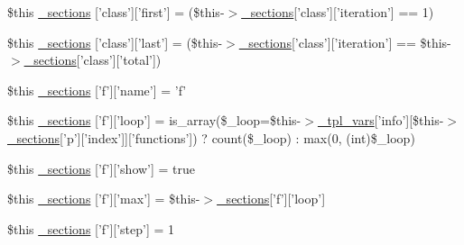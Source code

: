 \begin{DoxyCompactItemize}
\item 
\$this \hyperlink{_06_06-72_05_06_06-727729411_05left__frame_8tpl_8php_af9ec324c252510a476297b78b7391d23}{\-\_\-sections} \mbox{[}'class'\mbox{]}\mbox{[}'first'\mbox{]} = (\$this-\/$>$\hyperlink{_06_06127_05_06_0612781687_05pkgelementindex_8tpl_8php_a9e3d26b39edfe29c3f29b8035ef33828}{\-\_\-sections}\mbox{[}'class'\mbox{]}\mbox{[}'iteration'\mbox{]} == 1)
\item 
\$this \hyperlink{_06_06-72_05_06_06-727729411_05left__frame_8tpl_8php_ac4c55d054b0d9c9a6f09a4e31871f7d7}{\-\_\-sections} \mbox{[}'class'\mbox{]}\mbox{[}'last'\mbox{]} = (\$this-\/$>$\hyperlink{_06_06127_05_06_0612781687_05pkgelementindex_8tpl_8php_a9e3d26b39edfe29c3f29b8035ef33828}{\-\_\-sections}\mbox{[}'class'\mbox{]}\mbox{[}'iteration'\mbox{]} == \$this-\/$>$\hyperlink{_06_06127_05_06_0612781687_05pkgelementindex_8tpl_8php_a9e3d26b39edfe29c3f29b8035ef33828}{\-\_\-sections}\mbox{[}'class'\mbox{]}\mbox{[}'total'\mbox{]})
\item 
\$this \hyperlink{_06_06-72_05_06_06-727729411_05left__frame_8tpl_8php_a4478d5d9e899e009e4cf24ae8c2a6bd7}{\-\_\-sections} \mbox{[}'f'\mbox{]}\mbox{[}'name'\mbox{]} = 'f'
\item 
\$this \hyperlink{_06_06-72_05_06_06-727729411_05left__frame_8tpl_8php_a86b1899519b94e6341ff56e790349cbd}{\-\_\-sections} \mbox{[}'f'\mbox{]}\mbox{[}'loop'\mbox{]} = is\-\_\-array(\$\-\_\-loop=\$this-\/$>$\hyperlink{_06_06127_05_06_0612781687_05pkgelementindex_8tpl_8php_a4a4846d8e68d455590131a05697f67a3}{\-\_\-tpl\-\_\-vars}\mbox{[}'info'\mbox{]}\mbox{[}\$this-\/$>$\hyperlink{_06_06127_05_06_0612781687_05pkgelementindex_8tpl_8php_a9e3d26b39edfe29c3f29b8035ef33828}{\-\_\-sections}\mbox{[}'p'\mbox{]}\mbox{[}'index'\mbox{]}\mbox{]}\mbox{[}'functions'\mbox{]}) ? count(\$\-\_\-loop) \-: max(0, (int)\$\-\_\-loop)
\item 
\$this \hyperlink{_06_06-72_05_06_06-727729411_05left__frame_8tpl_8php_a0225fd71d2855493dfec92598e8d83bb}{\-\_\-sections} \mbox{[}'f'\mbox{]}\mbox{[}'show'\mbox{]} = true
\item 
\$this \hyperlink{_06_06-72_05_06_06-727729411_05left__frame_8tpl_8php_aef65198fe298f00cd40faa726366773a}{\-\_\-sections} \mbox{[}'f'\mbox{]}\mbox{[}'max'\mbox{]} = \$this-\/$>$\hyperlink{_06_06127_05_06_0612781687_05pkgelementindex_8tpl_8php_a9e3d26b39edfe29c3f29b8035ef33828}{\-\_\-sections}\mbox{[}'f'\mbox{]}\mbox{[}'loop'\mbox{]}
\item 
\$this \hyperlink{_06_06-72_05_06_06-727729411_05left__frame_8tpl_8php_a273a6550bc80d0cbb7f3b0fde5a26905}{\-\_\-sections} \mbox{[}'f'\mbox{]}\mbox{[}'step'\mbox{]} = 1

\end{DoxyCompactItemize}
